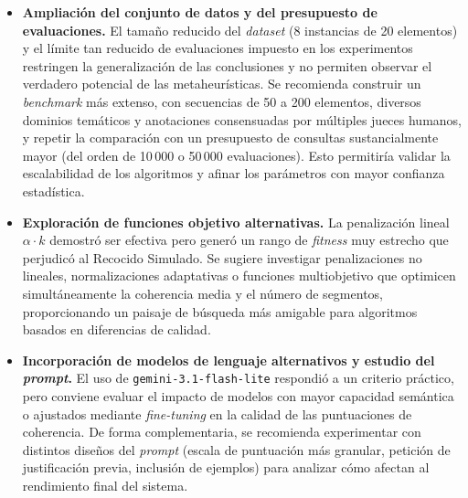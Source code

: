 \documentclass[letterpaper, 12pt]{report}
\begin{document}
\begin{itemize}
    \item \textbf{Ampliación del conjunto de datos y del presupuesto de evaluaciones.} 
    El tamaño reducido del \textit{dataset} (8 instancias de 20 elementos) y el límite tan reducido de evaluaciones impuesto en los experimentos restringen la generalización de las conclusiones y no permiten observar el verdadero potencial de las metaheurísticas. Se recomienda construir un \textit{benchmark} más extenso, con secuencias de 50 a 200 elementos, diversos dominios temáticos y anotaciones consensuadas por múltiples jueces humanos, y repetir la comparación con un presupuesto de consultas sustancialmente mayor (del orden de 10\,000 o 50\,000 evaluaciones). Esto permitiría validar la escalabilidad de los algoritmos y afinar los parámetros con mayor confianza estadística.
    
    \item \textbf{Exploración de funciones objetivo alternativas.}
    La penalización lineal $\alpha \cdot k$ demostró ser efectiva pero generó un rango de \textit{fitness} muy estrecho que perjudicó al Recocido Simulado. Se sugiere investigar penalizaciones no lineales, normalizaciones adaptativas o funciones multiobjetivo que optimicen simultáneamente la coherencia media y el número de segmentos, proporcionando un paisaje de búsqueda más amigable para algoritmos basados en diferencias de calidad.
    
    \item \textbf{Incorporación de modelos de lenguaje alternativos y estudio del \textit{prompt}.}
    El uso de \texttt{gemini-3.1-flash-lite} respondió a un criterio práctico, pero conviene evaluar el impacto de modelos con mayor capacidad semántica o ajustados mediante \textit{fine-tuning} en la calidad de las puntuaciones de coherencia. De forma complementaria, se recomienda experimentar con distintos diseños del \textit{prompt} (escala de puntuación más granular, petición de justificación previa, inclusión de ejemplos) para analizar cómo afectan al rendimiento final del sistema. 
\end{itemize}




 
\end{document}

